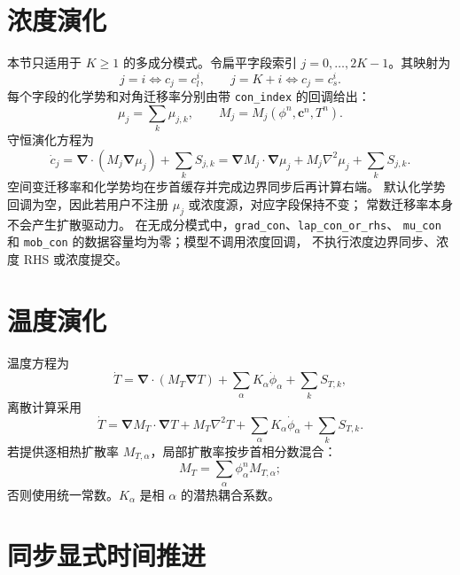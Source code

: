 \documentclass[UTF8,a4paper,11pt]{ctexart}
\newcommand{\grad}{\bm{\nabla}}
\newcommand{\diver}{\bm{\nabla}\!\cdot}
\newcommand{\vct}[1]{\bm{#1}}
\begin{document}
\section{浓度演化}

本节只适用于 \(K\geq1\) 的多成分模式。令扁平字段索引 \(j=0,\ldots,2K-1\)。其映射为
\[
 j=i\Longleftrightarrow c_j=c_l^i,\qquad
 j=K+i\Longleftrightarrow c_j=c_s^i.
\]
每个字段的化学势和对角迁移率分别由带 \texttt{con\_index} 的回调给出：
\begin{equation}
 \mu_j=\sum_k\mu_{j,k},\qquad
 M_j=M_j(\phi^n,\vct c^n,T^n).
\end{equation}
守恒演化方程为
\begin{equation}
 \dot c_j
 =\diver(M_j\grad\mu_j)+\sum_k S_{j,k}
 =\grad M_j\cdot\grad\mu_j
 +M_j\nabla^2\mu_j+\sum_kS_{j,k}.
\end{equation}
空间变迁移率和化学势均在步首缓存并完成边界同步后再计算右端。
默认化学势回调为空，因此若用户不注册 \(\mu_j\) 或浓度源，对应字段保持不变；
常数迁移率本身不会产生扩散驱动力。
在无成分模式中，\texttt{grad\_con}、\texttt{lap\_con\_or\_rhs}、
\texttt{mu\_con} 和 \texttt{mob\_con} 的数据容量均为零；模型不调用浓度回调，
不执行浓度边界同步、浓度 RHS 或浓度提交。

\section{温度演化}

温度方程为
\begin{equation}
 \dot T
 =\diver(M_T\grad T)
 +\sum_\alpha K_\alpha\dot\phi_\alpha
 +\sum_k S_{T,k},
\end{equation}
离散计算采用
\begin{equation}
 \dot T
 =\grad M_T\cdot\grad T+M_T\nabla^2T
 +\sum_\alpha K_\alpha\dot\phi_\alpha
 +\sum_k S_{T,k}.
\end{equation}
若提供逐相热扩散率 \(M_{T,\alpha}\)，局部扩散率按步首相分数混合：
\begin{equation}
 M_T=\sum_\alpha\phi_\alpha^n M_{T,\alpha};
\end{equation}
否则使用统一常数。\(K_\alpha\) 是相 \(\alpha\) 的潜热耦合系数。

\section{同步显式时间推进}
\end{document}
